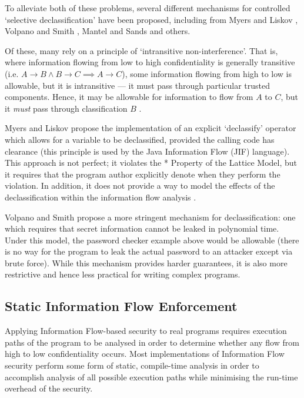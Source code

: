 To alleviate both of these problems, several different mechanisms for controlled `selective declassification' have been proposed, including from Myers and Liskov \cite{myers1997if}, Volpano and Smith \cite{volpano2000declassification}, Mantel and Sands \cite{mantel2004controlled} and others.

Of these, many rely on a principle of `intransitive non-interference'. That is, where information flowing from low to high confidentiality is generally transitive (i.e. $ A \rightarrow B \wedge B \rightarrow C \implies A \rightarrow C $), some information flowing from high to low is allowable, but it is intransitive --- it must pass through particular trusted components. Hence, it may be allowable for information to flow from $ A $ to $ C $, but it \textit{must} pass through classification $ B $ \cite{roscoe1999intransitive}.

Myers and Liskov \cite{myers1997if} propose the implementation of an explicit `declassify' operator which allows for a variable to be declassified, provided the calling code has clearance (this principle is used by the Java Information Flow (JIF) language). This approach is not perfect; it violates the * Property of the Lattice Model, but it requires that the program author explicitly denote when they perform the violation. In addition, it does not provide a way to model the effects of the declassification within the information flow analysis  \cite{zdancewic2004challenges}.

Volpano and Smith \cite{volpano2000declassification} propose a more stringent mechanism for declassification: one which requires that secret information cannot be leaked in polynomial time. Under this model, the password checker example above would be allowable (there is no way for the program to leak the actual password to an attacker except via brute force). While this mechanism provides harder guarantees, it is also more restrictive \cite{zdancewic2004challenges} and hence less practical for writing complex programs.

\subsection{Static Information Flow Enforcement}

Applying Information Flow-based security to real programs requires execution paths of the program to be analysed in order to determine whether any flow from high to low confidentiality occurs. Most implementations of Information Flow security perform some form of static, compile-time analysis in order to accomplish analysis of all possible execution paths while minimising the run-time overhead of the security.

